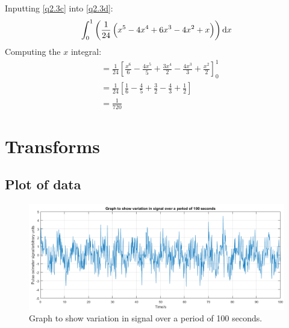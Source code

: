 \documentclass[11pt]{article}
\numberwithin{equation}{section}
\begin{document}
Inputting \ref{q2.3c} into \ref{q2.3d}:
\begin{equation}
    \int_0^1 \left( \frac{1}{24}\left(x^5 -4x^4 +6x^3 -4x^2 + x\right) \right)\dif x 
\end{equation}
Computing the $x$ integral:
\begin{align}
    &= \frac{1}{24}\left[\frac{x^6}{6}-\frac{4x^5}{5}+\frac{3x^4}{2}-\frac{4x^3}{3} + \frac{x^2}{2}\right]_0^1\\
    &= \frac{1}{24}\left[\frac{1}{6} - \frac{4}{5} + \frac{3}{2} - \frac{4}{3} + \frac{1}{2}\right]\\
    &= \frac{1}{720}
\end{align}
\section{Transforms}
\subsection{Plot of data}

\begin{figure}[H]
    \centering
    \includegraphics[width = \textwidth]{./img/q301a.png}
    \caption{Graph to show variation in signal over a period of 100 seconds.}
\end{figure}
\end{document}
